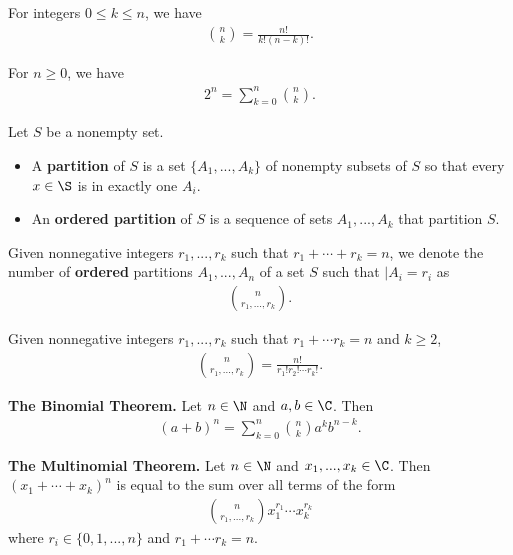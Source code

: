 \documentclass{article}
\begin{document}
\begin{theorem}
    For integers $0\leq k \leq n$, we have
    \begin{align*}
        \binom{n}{k}=\frac{n!}{k!(n-k)!}.
    \end{align*}
\end{theorem}
\begin{corollary}
    For $n\geq 0$, we have
    \begin{align*}
        2^n = \sum_{k=0}^n \binom{n}{k}.
    \end{align*}
\end{corollary}
\begin{definition}
    Let $S$ be a nonempty set.
    \begin{itemize}
        \item A \textbf{partition} of $S$ is a set $\{A_1,...,A_k\}$ of nonempty subsets of $S$ so that every $x\in\S$ is in exactly one $A_i$.
        \item An \textbf{ordered partition} of $S$ is a sequence of sets $A_1,...,A_k$ that partition $S$.
    \end{itemize}
\end{definition}
\begin{definition}
    Given nonnegative integers $r_1, ..., r_k$ such that $r_1+\cdots + r_k=n$, we denote the number of \textbf{ordered} partitions $A_1,..., A_n$ of a set $S$ such that $|A_i=r_i$ as
    \begin{align*}
        \binom{n}{r_1,...,r_k}.
    \end{align*}
\end{definition}
\begin{theorem}
    Given nonnegative integers $r_1, ..., r_k$ such that $r_1+\cdots r_k=n$ and $k\geq 2$, 
    \begin{align*}
        \binom{n}{r_1, ..., r_k}=\frac{n!}{r_1!r_2!\cdots r_k!}.
    \end{align*}
\end{theorem}
\begin{theorem}
    \textbf{The Binomial Theorem.} Let $n\in\N$ and $a,b\in\C$. Then
    \begin{align*}
        (a+b)^n=\sum_{k=0}^n \binom{n}{k}a^kb^{n-k}.
    \end{align*}
\end{theorem}
\begin{theorem}
    \textbf{The Multinomial Theorem.} Let $n\in\N$ and $x_1, ..., x_k\in\C$. Then $(x_1+\cdots+x_k)^n$ is equal to the sum over all terms of the form
    \begin{align*}
        \binom{n}{r_1,...,r_k}x_1^{r_1}\cdots x_k^{r_k}
    \end{align*}
    where $r_i\in\{0,1,...,n\}$ and $r_1+\cdots r_k=n$.
\end{theorem}
\end{document}
